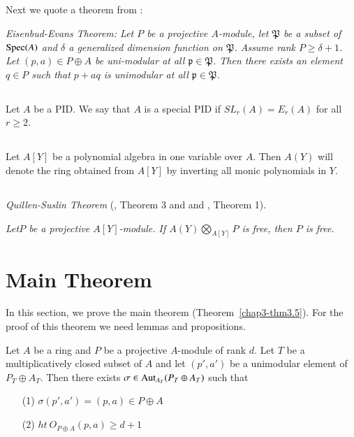 \subsection{}\label{chap3-sec2.6}
Next we quote a theorem from \cite{chap3-P}:

{\em Eisenbud-Evans Theorem: Let $P$ be a projective $A$-module, let
$\mathfrak{P}$ be a subset of $\operatorname{Spec} (A)$ and $\delta$ a generalized
dimension function on $\mathfrak{P}$. Assume rank
$P\geq \delta+1$. Let $(p,a)\in P\oplus A$ be uni-modular at all
$\mathfrak{p}\in \mathfrak{P}$. Then there exists an element $q\in P$
such that $p+aq$ is unimodular at all $\mathfrak{p}\in \mathfrak{P}$.}

\subsection{}\label{chap3-sec2.7}
Let $A$ be a PID. We say that $A$ is a special PID if
$SL_{r}(A)=E_{r}(A)$ for all $r\geq 2$.

\subsection{}\label{chap3-sec2.8}
Let $A[Y]$ be a polynomial algebra in one variable over $A$. Then
$A(Y)$ will denote the ring obtained from $A[Y]$ by inverting all
monic polynomials in $Y$.

\subsection{}\label{chap3-sec2.9}
{\em Quillen-Suslin Theorem} (\cite{chap3-Q}, Theorem 3 and
and \cite{chap3-Su}, Theorem 1).

{\em Let\pageoriginale $P$ be a projective $A[Y]$-module. If
$A(Y)\bigotimes\limits_{A[Y]} P$ is free, then $P$ is free.} 

\section{Main Theorem}\label{chap3-sec3}

In this section, we prove the main theorem
(Theorem~\ref{chap3-thm3.5}). For the proof of this theorem we need
lemmas and propositions.

\begin{proposition}\label{chap3-prop3.1}
Let $A$ be a ring and $P$ be a projective $A$-module of rank $d$. Let
$T$ be a multiplicatively closed subset of $A$ and let $(p',a')$ be a
unimodular element of $P_{T}\oplus A_{T}$. Then there exists
$\sigma\in \operatorname{Aut}_{A_{T}}(P_{T}\oplus A_{T})$ such that
\begin{itemize}
\item[\rm(1)] $\sigma(p',a')=(p,a)\in P\oplus A$

\item[\rm(2)] $ht\ O_{P\oplus A}(p,a)\geq d+1$
\end{itemize}
\end{proposition}

